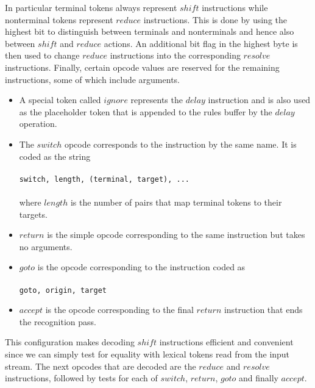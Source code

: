 \documentclass[envcountsame,runningheads]{llncs}
\begin{document}
In particular terminal tokens always represent $shi\!ft$ instructions while nonterminal tokens represent $reduce$ instructions.
This is done by using the highest bit to distinguish between terminals and nonterminals and hence also between $shi\!ft$ and $reduce$ actions.
An additional bit flag in the highest byte is then used to change $reduce$ instructions into the corresponding $resolve$ instructions.
Finally, certain opcode values are reserved for the remaining instructions, some of which include arguments.


\begin{itemize}
\item A special token called $ignore$ represents the $delay$ instruction and is also used as the placeholder token that is appended to the rules buffer by the $delay$ operation.
\item The $switch$ opcode corresponds to the instruction by the same name. It is coded as the string\\\\
      \texttt{switch, length, (terminal, target), ...}\\\\
      where $length$ is the number of pairs that map terminal tokens to their targets.
\item $return$ is the simple opcode corresponding to the same instruction but takes no arguments.
\item $goto$ is the opcode corresponding to the instruction coded as\\\\
      \texttt{goto, origin, target}\\
\item $accept$ is the opcode corresponding to the final $return$ instruction that ends the recognition pass.
\end{itemize}


This configuration makes decoding $shi\!ft$ instructions efficient and convenient since we can simply test for equality with lexical tokens read from the input stream. 
The next opcodes that are decoded are the $reduce$ and $resolve$ instructions, followed by tests for each of $switch$, $return$, $goto$ and finally $accept$.
\end{document}
